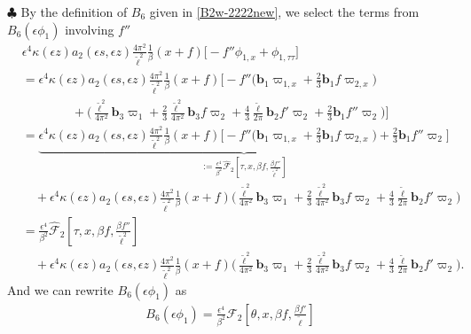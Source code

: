 \documentclass[10pt, reqno]{amsart}
\numberwithin{equation}{section}
\theoremstyle{definition}
\begin{document}
{{\smallskip\noindent $\clubsuit$
By the definition of $B_6$ given in \eqref{B2w-2222new}, we
 select the terms from $ B_6(\epsilon\phi_1)$ involving $f''$
\begin{align}
& \epsilon^4 \kappa(\epsilon z) a_2(\epsilon s, \epsilon z) \frac{ 4\pi^2} {{\tilde\ell}^2}\frac{1}{\beta} (x+f)\big[ -f''\phi_{1, x} +\phi_{1, \tau\tau}\big]
\nonumber\\[2mm]
& = \epsilon^4 \kappa(\epsilon z) a_2(\epsilon s, \epsilon z) \frac{ 4\pi^2} {{\tilde\ell}^2}\frac{1}{\beta} (x+f)\Bigg[ -f'' \big({\mathbf b}_1\varpi_{1,x} +\frac{2}{3}{\mathbf b}_1 f \varpi_{2,x} \big)
\nonumber\\[2mm]
& \qquad\qquad
+ \Big(\frac{{\tilde\ell}^2}{4\pi^2} {\mathbf b}_3 \varpi_{1}
+
\frac{2}{3}\frac{{\tilde\ell}^2}{4\pi^2}{\mathbf b}_3 f \varpi_{2}
+
\frac{4}{3}\frac{{\tilde\ell}}{2\pi}{\mathbf b}_2f' \varpi_{2}
+
\frac{2}{3}{\mathbf b}_1 f''\varpi_{2} \Big)\Bigg]
\nonumber\\[2mm]
& = \underbrace{\epsilon^4 \kappa(\epsilon z) a_2(\epsilon s, \epsilon z) \frac{ 4\pi^2} {{\tilde\ell}^2}\frac{1}{\beta} (x+f)\Bigg[ -f'' \big({\mathbf b}_1\varpi_{1,x} +\frac{2}{3}{\mathbf b}_1 f \varpi_{2,x} \big)
 +
\frac{2}{3}{\mathbf b}_1 f''\varpi_{2} \Bigg]}_{:= \frac{\epsilon^4}{\beta^2} \hat{\mathcal F}_2\left[\tau, x, \beta f, \frac{\beta f''}{\tilde\ell^2} \right] }
\nonumber\\[2mm]
& \quad + \epsilon^4 \kappa(\epsilon z) a_2(\epsilon s, \epsilon z) \frac{ 4\pi^2} {{\tilde\ell}^2}\frac{1}{\beta} (x+f) \Big(\frac{{\tilde\ell}^2}{4\pi^2} {\mathbf b}_3 \varpi_{1}
+
\frac{2}{3}\frac{{\tilde\ell}^2}{4\pi^2}{\mathbf b}_3 f \varpi_{2}
+
\frac{4}{3}\frac{{\tilde\ell}}{2\pi}{\mathbf b}_2f' \varpi_{2} \Big)
\nonumber\\[2mm]
& = \frac{\epsilon^4}{\beta^2} \hat{\mathcal F}_2\left[\tau, x, \beta f, \frac{\beta f''}{\tilde\ell^2} \right]
\nonumber\\[2mm]
& \quad+ \epsilon^4 \kappa(\epsilon z) a_2(\epsilon s, \epsilon z) \frac{ 4\pi^2} {{\tilde\ell}^2}\frac{1}{\beta} (x+f) \Big(\frac{{\tilde\ell}^2}{4\pi^2} {\mathbf b}_3 \varpi_{1}
+
\frac{2}{3}\frac{{\tilde\ell}^2}{4\pi^2}{\mathbf b}_3 f \varpi_{2}
+
\frac{4}{3}\frac{{\tilde\ell}}{2\pi}{\mathbf b}_2f' \varpi_{2} \Big). \label{hat mathcal F2}
\end{align}
And we can rewrite $ B_6(\epsilon\phi_1) $ as
\begin{align}\label{expression of B6phi1}
 B_6(\epsilon\phi_1) = \frac{\epsilon^4}{\beta^2} \mathcal F_2\left[\theta, x, \beta f, \frac{\beta f'}{\tilde\ell}\right]

\end{align}}}
\end{document}
